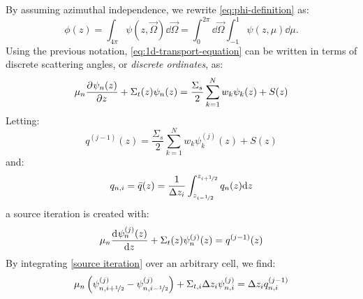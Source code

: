 \documentclass{NE515}
\theoremstyle{definition}
\begin{document}
    By assuming azimuthal independence, we rewrite \cref{eq:phi-definition} as:
    \begin{equation}
        \phi(z)=\int_{4\pi}^{}\psi(z,\vec{\Omega})\dd \vec{\Omega} = \int_{0}^{2\pi } \dd \vec{\Omega} \int_{-1}^{1} \psi(z,\mu)\dd \mu.
    \end{equation}
    Using the previous notation, \cref{eq:1d-transport-equation} can be written in terms of discrete scattering angles, or \textit{discrete ordinates}, as:
    \begin{equation}
        \mu_n \pdv[]{\psi_n (z)}{z}+\Sigma_t(z)\psi_n(z)=\frac{\Sigma_s}{2}\sum_{k=1}^{N} w_k \psi_k(z)+S(z)
    \end{equation}
    Letting:
    \begin{equation}
        q^{(j-1)}(z) = \frac{\Sigma_s}{2}\sum_{k=1}^{N} w_k \psi^{(j)}_k(z)+S(z)
    \end{equation}
    and:
    \begin{equation}
        q_{n,i}=\bar{q}(z)=\frac{1}{\Delta z_i}\int_{z_{i-\nicefrac{1}{2}}}^{z_{i+\nicefrac{1}{2}}} q_n(z)\dd z
    \end{equation}
    a source iteration is created with:
    \begin{equation}
        \label{source iteration}
        \mu_n \dv[]{\psi_n^{(j)}(z)}{z}+\Sigma_t(z)\psi_n^{(j)}(z)=q^{(j-1)}(z)
    \end{equation}
    By integrating \cref{source iteration} over an arbitrary cell, we find:
    \begin{equation}
        \mu_n\left( \psi_{n,i+\nicefrac{1}{2}}^{(j)}-\psi_{n,i-\nicefrac{1}{2}}^{(j)} \right)+\Sigma_{t,i}\Delta z_i \psi_{n,i}^{(j)}=\Delta z_i q_{n,i}^{(j-1)}
    \end{equation}
\end{document}
